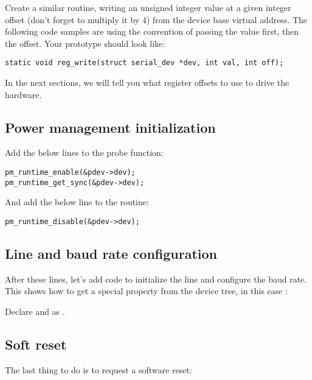 Create a similar  routine, writing an unsigned integer
value at a given integer offset (don't forget to multiply it by 4) from
the device base virtual address. The following code samples are using
the  convention of passing the value first, then the
offset. Your prototype should look like:
\begin{verbatim}
static void reg_write(struct serial_dev *dev, int val, int off);
\end{verbatim}

In the next sections, we will tell you what register offsets to use
to drive the hardware. 

\subsection{Power management initialization}

Add the below lines to the probe function:

\begin{verbatim}
pm_runtime_enable(&pdev->dev);
pm_runtime_get_sync(&pdev->dev);
\end{verbatim}

And add the below line to the  routine:

\begin{verbatim}
pm_runtime_disable(&pdev->dev);
\end{verbatim}

\subsection{Line and baud rate configuration}

After these lines, let's add code to initialize the line
and configure the baud rate. This shows how to get a special
property from the device tree, in this case :


Declare  and  as .

\subsection{Soft reset}

The last thing to do is to request a software reset:



